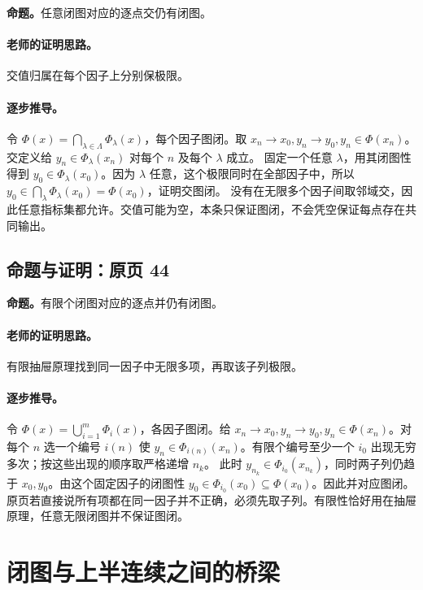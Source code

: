 \documentclass[11pt,a4paper]{article}
\theoremstyle{definition}\newtheorem{definition}{定义}\newtheorem{example}{例}
\begin{document}
\textbf{命题。}任意闭图对应的逐点交仍有闭图。

\paragraph{老师的证明思路。}交值归属在每个因子上分别保极限。

\paragraph{逐步推导。}
令 $\Phi(x)=\bigcap_{\lambda\in\Lambda}\Phi_\lambda(x)$，每个因子图闭。取 $x_n\to x_0,y_n\to y_0,y_n\in\Phi(x_n)$。交定义给 $y_n\in\Phi_\lambda(x_n)$ 对每个 $n$ 及每个 $\lambda$ 成立。
固定一个任意 $\lambda$，用其闭图性得到 $y_0\in\Phi_\lambda(x_0)$。因为 $\lambda$ 任意，这个极限同时在全部因子中，所以 $y_0\in\bigcap_\lambda\Phi_\lambda(x_0)=\Phi(x_0)$，证明交图闭。
没有在无限多个因子间取邻域交，因此任意指标集都允许。交值可能为空，本条只保证图闭，不会凭空保证每点存在共同输出。


\subsection{命题与证明：原页 44}

\textbf{命题。}有限个闭图对应的逐点并仍有闭图。

\paragraph{老师的证明思路。}有限抽屉原理找到同一因子中无限多项，再取该子列极限。

\paragraph{逐步推导。}
令 $\Phi(x)=\bigcup_{i=1}^m\Phi_i(x)$，各因子图闭。给 $x_n\to x_0,y_n\to y_0,y_n\in\Phi(x_n)$。对每个 $n$ 选一个编号 $i(n)$ 使 $y_n\in\Phi_{i(n)}(x_n)$。有限个编号至少一个 $i_0$ 出现无穷多次；按这些出现的顺序取严格递增 $n_k$。
此时 $y_{n_k}\in\Phi_{i_0}(x_{n_k})$，同时两子列仍趋于 $x_0,y_0$。由这个固定因子的闭图性 $y_0\in\Phi_{i_0}(x_0)\subseteq\Phi(x_0)$。因此并对应图闭。
原页若直接说所有项都在同一因子并不正确，必须先取子列。有限性恰好用在抽屉原理，任意无限闭图并不保证图闭。


\clearpage\section{闭图与上半连续之间的桥梁}\label{g:108:45}
\end{document}
